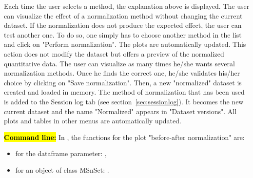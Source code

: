 \documentclass[12pt]{article}
\begin{document}
\begin {description}
\end {description}

Each time the user selects a method, the explanation above is displayed. The 
user can visualize the effect of a normalization method without changing the 
current dataset. If the normalization does not produce the expected effect, 
the user can test another one. To do so, one simply has to choose another 
method in the list and click on "Perform normalization". The plots are 
automatically updated. This action does not modify the dataset but offers a 
preview of the normalized quantitative data.
The user can visualize as many times he/she wants several normalization 
methods. Once he finds the correct one, he/she validates his/her choice by 
clicking on "Save normalization". Then, a new "normalized" dataset is created 
and loaded in memory. The method of normalization that has been used is 
added to the Session log tab (see section~\ref{sec:sessionlog}). It becomes 
the new current dataset and the name "Normalized" appears in "Dataset 
versions". All plots and tables in other menus are automatically updated.

{\hl{\bf Command line:} In , the functions for the plot 
"before-after normalization" are:
\begin{itemize}
\item for the dataframe parameter:  ,
\item for an object of class MSnSet: 
 .
\end{itemize}}
\end{document}
